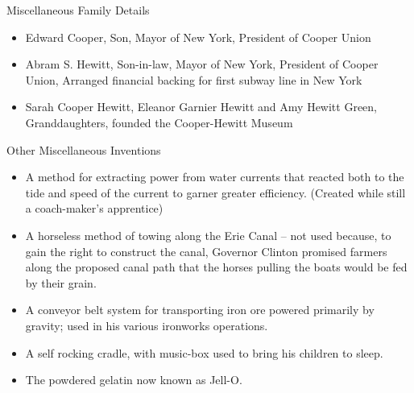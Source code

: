 \documentclass{article}
\begin{document}
\begin{minipage}[t]{0.46\linewidth}
\fontsize{11pt}{13pt}\selectfont
\raggedright
\upshape
\begin{enumList}
\setcounter{enumListi}{\value{enumTemp}}

\item Miscellaneous Family Details
\begin{itemize}[leftmargin=*]
\item Edward Cooper, Son, Mayor of New York, President of Cooper Union

\item Abram S. Hewitt, Son-in-law, Mayor of New York, President of Cooper Union,
Arranged financial backing for first subway line in New York

\item Sarah Cooper Hewitt, Eleanor Garnier Hewitt and Amy Hewitt Green,
Granddaughters, founded the Cooper-Hewitt Museum

\end{itemize}

\item Other Miscellaneous Inventions
\begin{itemize}[leftmargin=*]

\item A method for extracting power from water currents that reacted both to
the tide and speed of the current to garner greater efficiency. (Created while
still a coach-maker's apprentice)

\item A horseless method of towing along the Erie Canal -- not used because,
to gain the right to construct the canal, Governor Clinton promised farmers
along the proposed canal path that the horses pulling the boats would be fed
by their grain.

\item A conveyor belt system for transporting iron ore powered primarily by
gravity; used in his various ironworks operations.

\item A self rocking cradle, with music-box used to bring his children to
sleep.

\item The powdered gelatin now known as Jell-O.
\end{itemize}
\end{enumList}

\fontsize{9.5pt}{9.5pt}\selectfont
\upshape
\raggedright
\nocite{*}




\end{minipage}
\end{document}
